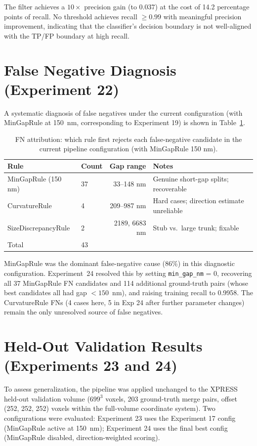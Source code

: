 The filter achieves a $10\times$ precision gain (to 0.037) at the cost of 14.2
percentage points of recall. No threshold achieves recall $\geq 0.99$ with
meaningful precision improvement, indicating that the classifier's decision
boundary is not well-aligned with the TP/FP boundary at high recall.

\section{False Negative Diagnosis (Experiment 22)}

A systematic diagnosis of false negatives under the current configuration
(with MinGapRule at 150~nm, corresponding to Experiment 19) is shown in
Table~\ref{tab:fn_diagnosis}.

\begin{table}[H]
\centering
\caption{FN attribution: which rule first rejects each false-negative candidate
in the current pipeline configuration (with MinGapRule 150 nm).}
\label{tab:fn_diagnosis}
\begin{tabular}{@{}llrl@{}}
\toprule
Rule & Count & Gap range & Notes \\
\midrule
MinGapRule (150 nm) & 37 & 33--148 nm & Genuine short-gap splits; recoverable \\
CurvatureRule & 4 & 209--987 nm & Hard cases; direction estimate unreliable \\
SizeDiscrepancyRule & 2 & 2189, 6683 nm & Stub vs.\ large trunk; fixable \\
\midrule
Total & 43 & & \\
\bottomrule
\end{tabular}
\end{table}

MinGapRule was the dominant false-negative cause (86\%) in this diagnostic
configuration. Experiment~24 resolved this by setting \texttt{min\_gap\_nm} = 0,
recovering all 37 MinGapRule FN candidates and 114 additional ground-truth pairs
(whose best candidates all had gap $< 150$~nm), and raising training recall
to 0.9958. The CurvatureRule FNs (4 cases here, 5 in Exp 24 after further
parameter changes) remain the only unresolved source of false negatives.

\section{Held-Out Validation Results (Experiments 23 and 24)}

To assess generalization, the pipeline was applied unchanged to the XPRESS
held-out validation volume ($699^3$ voxels, 203 ground-truth merge pairs, offset
(252, 252, 252) voxels within the full-volume coordinate system). Two
configurations were evaluated: Experiment 23 uses the Experiment 17 config
(MinGapRule active at 150~nm); Experiment 24 uses the final best config
(MinGapRule disabled, direction-weighted scoring).

